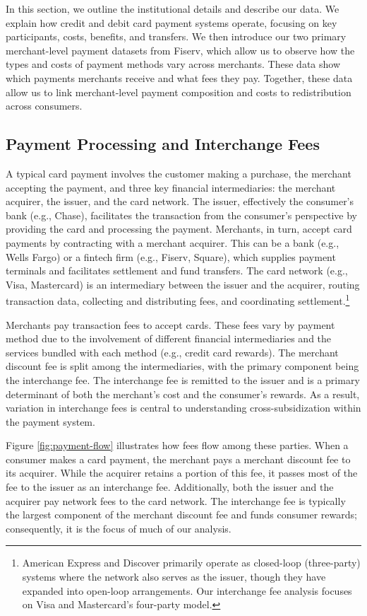 \documentclass[11pt,english]{article}
\theoremstyle{remark}
\begin{document}
In this section, we outline the institutional details and describe our data.
We explain how credit and debit card payment systems operate, focusing on key participants, costs, benefits, and transfers.
We then introduce our two primary merchant-level payment datasets from Fiserv, which allow us to observe how the types and costs of payment methods vary across merchants.
These data show which payments merchants receive and what fees they pay.
Together, these data allow us to link merchant-level payment composition and costs to redistribution across consumers.

\subsection{Payment Processing and Interchange Fees}

A typical card payment involves the customer making a purchase, the merchant accepting the payment, and three key financial intermediaries: the merchant acquirer, the issuer, and the card network.
The issuer, effectively the consumer's bank (e.g., Chase), facilitates the transaction from the consumer's perspective by providing the card and processing the payment.
Merchants, in turn, accept card payments by contracting with a merchant acquirer.
This can be a bank (e.g., Wells Fargo) or a fintech firm (e.g., Fiserv, Square), which supplies payment terminals and facilitates settlement and fund transfers.
The card network (e.g., Visa, Mastercard) is an intermediary between the issuer and the acquirer, routing transaction data, collecting and distributing fees, and coordinating settlement.\footnote{American Express and Discover primarily operate as closed-loop (three-party) systems where the network also serves as the issuer, though they have expanded into open-loop arrangements. Our interchange fee analysis focuses on Visa and Mastercard's four-party model.}

Merchants pay transaction fees to accept cards. These fees vary by payment method due to the involvement of different financial intermediaries and the services bundled with each method (e.g., credit card rewards).
The merchant discount fee is split among the intermediaries, with the primary component being the interchange fee.
The interchange fee is remitted to the issuer and is a primary determinant of both the merchant's cost and the consumer's rewards.
As a result, variation in interchange fees is central to understanding cross-subsidization within the payment system.

Figure \ref{fig:payment-flow} illustrates how fees flow among these parties.
When a consumer makes a card payment, the merchant pays a merchant discount fee to its acquirer.
While the acquirer retains a portion of this fee, it passes most of the fee to the issuer as an interchange fee.
Additionally, both the issuer and the acquirer pay network fees to the card network.
The interchange fee is typically the largest component of the merchant discount fee and funds consumer rewards; consequently, it is the focus of much of our analysis.
\end{document}
